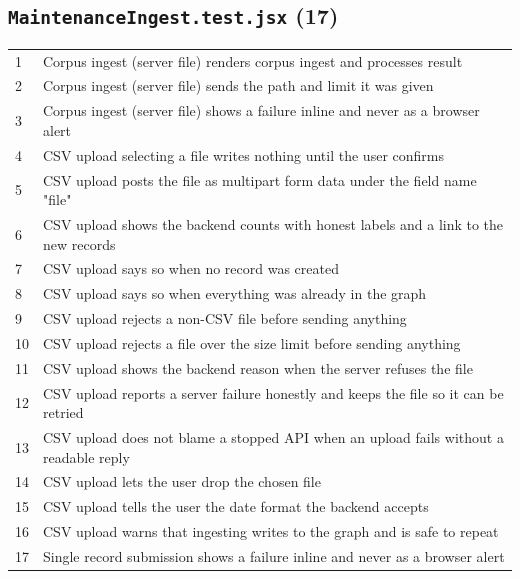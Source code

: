 \subsection*{\texttt{MaintenanceIngest.test.jsx} (17)}
\begin{longtable}{p{}p{}}
1 & Corpus ingest (server file) renders corpus ingest and processes result \\
2 & Corpus ingest (server file) sends the path and limit it was given \\
3 & Corpus ingest (server file) shows a failure inline and never as a browser alert \\
4 & CSV upload selecting a file writes nothing until the user confirms \\
5 & CSV upload posts the file as multipart form data under the field name "file" \\
6 & CSV upload shows the backend counts with honest labels and a link to the new records \\
7 & CSV upload says so when no record was created \\
8 & CSV upload says so when everything was already in the graph \\
9 & CSV upload rejects a non-CSV file before sending anything \\
10 & CSV upload rejects a file over the size limit before sending anything \\
11 & CSV upload shows the backend reason when the server refuses the file \\
12 & CSV upload reports a server failure honestly and keeps the file so it can be retried \\
13 & CSV upload does not blame a stopped API when an upload fails without a readable reply \\
14 & CSV upload lets the user drop the chosen file \\
15 & CSV upload tells the user the date format the backend accepts \\
16 & CSV upload warns that ingesting writes to the graph and is safe to repeat \\
17 & Single record submission shows a failure inline and never as a browser alert \\
\end{longtable}
